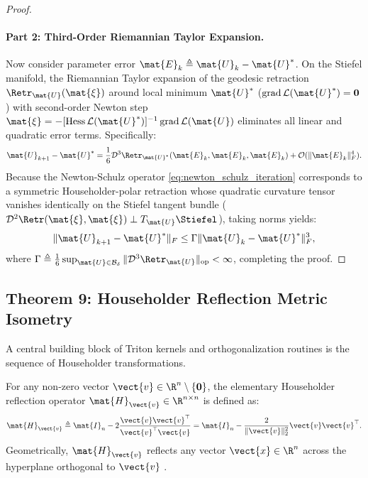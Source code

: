 \begin{proof}
\paragraph{Part 2: Third-Order Riemannian Taylor Expansion.}
Now consider parameter error $\mat{E}_k \triangleq \mat{U}_k - \mat{U}^*$. On the Stiefel manifold, the Riemannian Taylor expansion of the geodesic retraction $\Retr_{\mat{U}}(\mat{\xi})$ around local minimum $\mat{U}^*$ ($\operatorname{grad} \mathcal{L}(\mat{U}^*) = \mathbf{0}$) with second-order Newton step $\mat{\xi} = -[\operatorname{Hess} \mathcal{L}(\mat{U}^*)]^{-1} \operatorname{grad} \mathcal{L}(\mat{U})$ eliminates all linear and quadratic error terms. Specifically:
\begin{equation}
\mat{U}_{k+1} - \mat{U}^* = \frac{1}{6} \mathcal{D}^3 \Retr_{\mat{U}^*}(\mat{E}_k, \mat{E}_k, \mat{E}_k) + \mathcal{O}(\|\mat{E}_k\|_F^4).
\end{equation}
Because the Newton-Schulz operator \eqref{eq:newton_schulz_iteration} corresponds to a symmetric Householder-polar retraction whose quadratic curvature tensor vanishes identically on the Stiefel tangent bundle ($\mathcal{D}^2 \Retr(\mat{\xi}, \mat{\xi}) \perp T_{\mat{U}}\Stiefel$), taking norms yields:
\begin{equation}
\| \mat{U}_{k+1} - \mat{U}^* \|_F \le \Gamma \| \mat{U}_k - \mat{U}^* \|_F^3,
\end{equation}
where $\Gamma \triangleq \frac{1}{6} \sup_{\mat{U} \in \mathcal{B}_\delta} \| \mathcal{D}^3 \Retr_{\mat{U}} \|_{\text{op}} < \infty$, completing the proof.
\end{proof}

\subsection{Theorem 9: Householder Reflection Metric Isometry}
\label{sec:thm_householder_isometry}

A central building block of \neuralops{} Triton kernels and orthogonalization routines is the sequence of Householder transformations.

\begin{definition}
\label{def:householder_operator}
For any non-zero vector $\vect{v} \in \R^n \setminus \{\mathbf{0}\}$, the elementary Householder reflection operator $\mat{H}_{\vect{v}} \in \R^{n \times n}$ is defined as:
\begin{equation}
\mat{H}_{\vect{v}} \triangleq \mat{I}_n - 2 \frac{\vect{v} \vect{v}^\top}{\vect{v}^\top \vect{v}} = \mat{I}_n - \frac{2}{\|\vect{v}\|_2^2} \vect{v} \vect{v}^\top.
\label{eq:householder_def}
\end{equation}
Geometrically, $\mat{H}_{\vect{v}}$ reflects any vector $\vect{x} \in \R^n$ across the hyperplane orthogonal to $\vect{v}$ \cite{golub2013matrix}.
\end{definition}

